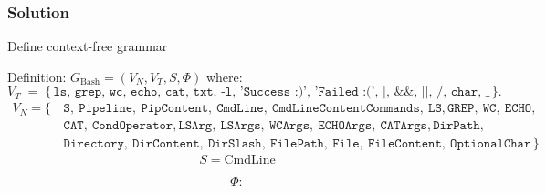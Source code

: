 \documentclass[10pt, a4paper]{article}
\begin{document}
\subsubsection{Solution }
\begin{abcliste}
    
\abc Define context-free grammar

Definition:  \( G_{\text{Bash}} = (V_N, V_T, S, \Phi) \) where: 
\begin{equation*}
V_T \;=\;
\{
\,\texttt{ls},\,
\texttt{grep},\,
\texttt{wc},\,
\texttt{echo},\,
\texttt{cat},\,
\texttt{txt},\,
\texttt{-l},\,
\texttt{'Success :)'},\,
\texttt{'Failed :('},\,
\texttt{|},\,
\texttt{\&\&},\,
\texttt{||},\,
\texttt{/},\,
\texttt{char},\,
\texttt{\_}\,
\}.
\end{equation*}
\begin{equation}
    \begin{split}
    V_N = \{\, 
    &\texttt{S},\ \texttt{Pipeline},\ \texttt{PipContent}, \ \texttt{CmdLine}, \ \texttt{CmdLineContent}  \texttt{Commands},\ \texttt{LS}, \texttt{GREP}, \ \texttt{WC}, \ \texttt{ECHO}, \\& \texttt{CAT}  ,  \ \texttt{CondOperator},  \texttt{LSArg},\ \texttt{LSArgs},\ \texttt{WCArgs},\ \texttt{ECHOArgs},\ \texttt{CATArgs},
    \texttt{DirPath},\\& \texttt{Directory},\ \texttt{DirContent},\ \texttt{DirSlash},\ \texttt{FilePath},\ \texttt{File},\ \texttt{FileContent},\ \texttt{OptionalChar}
    \,\}
    \end{split}
    \end{equation}
\newpage
\begin{equation*}
S = \text{CmdLine}
\end{equation*}

\begin{equation*}
\Phi :
\end{equation*}


\end{abcliste}
\end{document}
